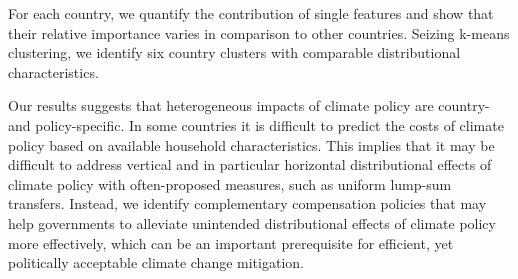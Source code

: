 \documentclass[12pt, a4paper]{article}
\begin{document}
For each country, we quantify the contribution of single features and show that their relative importance varies in comparison to other countries. Seizing k-means clustering, we identify six country clusters with comparable distributional characteristics.

Our results suggests that heterogeneous impacts of climate policy are country- and policy-specific. In some countries it is difficult to predict the costs of climate policy based on available household characteristics. This implies that it may be difficult to address vertical and in particular horizontal distributional effects of climate policy with often-proposed measures, such as uniform lump-sum transfers. Instead, we identify complementary compensation policies that may help governments to alleviate unintended distributional effects of climate policy more effectively, which can be an important prerequisite for efficient, yet politically acceptable climate change mitigation. 

\clearpage

\begin{refcontext}[sorting=nyt]
\printbibliography
\end{refcontext}

\clearpage
\end{document}
